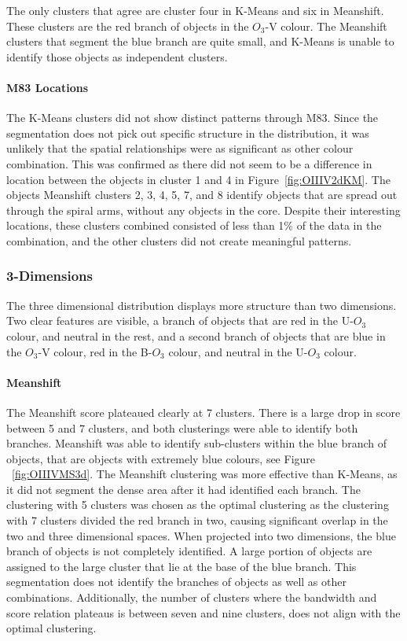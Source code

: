 The only clusters that agree are cluster four in K-Means and six in Meanshift.
These clusters are the red branch of objects in the $O_{3}$-V colour.
The Meanshift clusters that segment the blue branch are quite small, and K-Means is unable to identify those objects as independent clusters.

\paragraph{M83 Locations}
The K-Means clusters did not show distinct patterns through M83.
Since the segmentation does not pick out specific structure in the distribution, it was unlikely that the spatial relationships were as significant as other colour combination.
This was confirmed as there did not seem to be a difference in location between the objects in cluster 1 and 4 in Figure~\ref{fig:OIIIV2dKM}.
The objects Meanshift clusters 2, 3, 4, 5, 7, and 8 identify objects that are spread out through the spiral arms, without any objects in the core.
Despite their interesting locations, these clusters combined consisted of less than 1\% of the data in the combination, and the other clusters did not create meaningful patterns.

\subsubsection{3-Dimensions}
The three dimensional distribution displays more structure than two dimensions.
Two clear features are visible, a branch of objects that are red in the U-$O_{3}$ colour, and neutral in the rest, and a second branch of objects that are blue in the $O_{3}$-V colour, red in the B-$O_{3}$ colour, and neutral in the U-$O_{3}$ colour.

\paragraph{Meanshift}
The Meanshift score plateaued clearly at 7 clusters. There is a large drop in score between 5 and 7 clusters, and both clusterings were able to identify both branches.
Meanshift was able to identify sub-clusters within the blue branch of objects, that are objects with extremely blue colours, see Figure ~\ref{fig:OIIIVMS3d}.
The Meanshift clustering was more effective than K-Means, as it did not segment the dense area after it had identified each branch.
The clustering with 5 clusters was chosen as the optimal clustering as the clustering with 7 clusters divided the red branch in two, causing significant overlap in the two and three dimensional spaces.
When projected into two dimensions, the blue branch of objects is not completely identified.
A large portion of objects are assigned to the large cluster that lie at the base of the blue branch.
This segmentation does not identify the branches of objects as well as other combinations.
Additionally, the number of clusters where the bandwidth and score relation plateaus is between seven and nine clusters, does not align with the optimal clustering.

